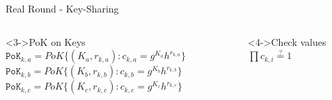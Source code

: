 \begin{frame}{Real Round - Key-Sharing}
\begin{columns}[c]
            \begin{block}<3->{PoK on Keys}
                \centering
                \scriptsize$\mathtt{PoK}_{k,a} = PoK\{(K_a, r_{k,a}): c_{k,a} = g^{K_a} h^{r_{k,a}}\}$\\
                \scriptsize$\mathtt{PoK}_{k,b} = PoK\{(K_b, r_{k,b}): c_{k,b} = g^{K_b} h^{r_{k,b}}\}$\\
                \scriptsize$\mathtt{PoK}_{k,c} = PoK\{(K_c, r_{k,c}): c_{k,c} = g^{K_c} h^{r_{k,c}}\}$\\
            \end{block}
            \begin{exampleblock}<4->{Check values}
                \centering
                $\prod c_{k,i} \overset{?}{=} 1$
            \end{exampleblock}
    \end{columns}
\end{frame}